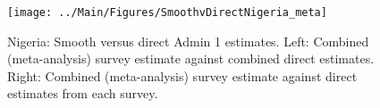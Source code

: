\documentclass[12pt]{article}\usepackage[]{graphicx}\usepackage[]{color}
\newenvironment{knitrout}{}{} %
\begin{document}

\begin{knitrout}
\color{fgcolor}\begin{figure}[bht]

{\centering \texttt{[image: ../Main/Figures/SmoothvDirectNigeria\_meta]} 

}

\caption[Nigeria]{Nigeria: Smooth versus direct Admin 1 estimates. Left: Combined (meta-analysis) survey estimate against combined direct estimates. Right: Combined (meta-analysis) survey estimate against direct estimates from each survey.}\label{fig:unnamed-chunk-263}
\end{figure}


\end{knitrout}
\end{document}
